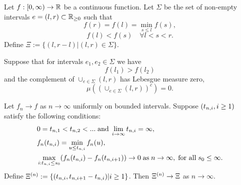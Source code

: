 



\begin{lemma}
Let $f:[0, \infty) \rightarrow \mathbb{R}$ be a continuous function. 
Let $\Sigma$ be the set of non-empty intervals 
$e=(l,r) \subset \mathbb{R}_{\geq 0}$
such that
\begin{equation} \label{E: cond 1}
f(r) = f(l) = \min_{s \leq l} f(s),
\end{equation}
\begin{equation} \label{E: cond 2}
f(l) < f(s) \quad \forall l < s < r.
\end{equation}
Define $\Xi := \lbrace (l, r-l) | (l, r) \in \Sigma \rbrace$.

Suppose that for intervals $e_1, e_2 \in \Sigma$ we have 
\begin{equation} \label{E: f(l1) > f(l2)}
f(l_1) > f(l_2)
\end{equation}
and the complement of $\cup_{e \in \Sigma} (l,r)$ has Lebesgue measure zero,
\begin{equation} \label{E: complement zero}
\mu \left( \left( \cup_{e \in \Sigma} (l,r) \right)^c\right) = 0.
\end{equation}

Let $f_n \rightarrow f$ as $n \rightarrow \infty$ uniformly on bounded intervals.
Suppose $(t_{n, i}, i \geq 1)$ satisfy the following conditions:
\begin{align}
&0 = t_{n, 1} < t_{n, 2} < ... \; \text{and} \; \lim_{i \rightarrow \infty} t_{n, i} = \infty, \label{E: cond 3} \\ 
&f_n(t_{n, i}) = \min_{u \leq t_{n, i}}f_n(u), \label{E: cond 4} \\ 
&\max_{i: t_{n, i} \leq s_0}(f_n(t_{n, i}) - f_n(t_{n, i+1})) \rightarrow 0 \; \text{as} \; n \rightarrow \infty, \; \text{for all} \; s_0 \leq \infty. \label{E: cond 5}
\end{align}
Define $\Xi^{(n)} := \lbrace (t_{n, i}, t_{n, i+1} - t_{n, i}) | i \geq 1 \rbrace$.
Then $\Xi^{(n)} \rightarrow \Xi$ as $n \rightarrow \infty$.
\end{lemma}


